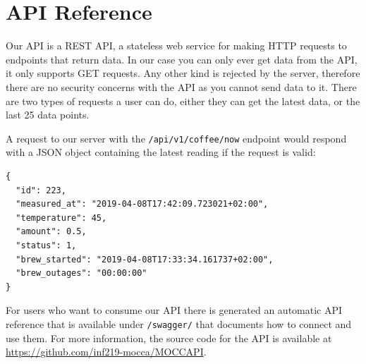 \documentclass[12pt,a4paper,oneside,article]{memoir}
\numberwithin{equation}{chapter}
\begin{document}
\chapter{API Reference}\label{sec:api-reference}
Our API is a REST API, a stateless web service for making HTTP requests to
endpoints that return data. In our case you can only ever get data from the API,
it only supports GET requests. Any other kind is rejected by the server,
therefore there are no security concerns with the API as you cannot send data to
it. There are two types of requests a user can do, either they can get the
latest data, or the last 25 data points.

A request to our server with the \lstinline{/api/v1/coffee/now} endpoint would
respond with a JSON object containing the latest reading if the request is valid:

\begin{lstlisting}
{
  "id": 223,
  "measured_at": "2019-04-08T17:42:09.723021+02:00",
  "temperature": 45,
  "amount": 0.5,
  "status": 1,
  "brew_started": "2019-04-08T17:33:34.161737+02:00",
  "brew_outages": "00:00:00"
}
\end{lstlisting}

For users who want to consume our API there is generated an automatic API
reference that is available under \lstinline{/swagger/} that documents how to
connect and use them. For more information, the source code for the API is
available at {\small\url{https://github.com/inf219-mocca/MOCCAPI}}.

\clearpage{}
\renewcommand*{\UrlFont}{\footnotesize\ttfamily}
\printbibliography{}
\end{document}
